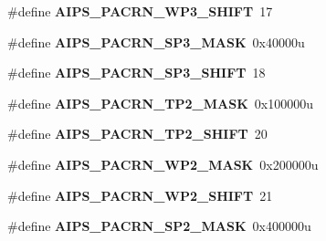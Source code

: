 \begin{DoxyCompactItemize}
\item 
\#define {\bfseries A\+I\+P\+S\+\_\+\+P\+A\+C\+R\+N\+\_\+\+W\+P3\+\_\+\+S\+H\+I\+FT}~17\hypertarget{group__AIPS__Register__Masks_gad54c0f7e77c172141f608dab604bed96}{}\label{group__AIPS__Register__Masks_gad54c0f7e77c172141f608dab604bed96}

\item 
\#define {\bfseries A\+I\+P\+S\+\_\+\+P\+A\+C\+R\+N\+\_\+\+S\+P3\+\_\+\+M\+A\+SK}~0x40000u\hypertarget{group__AIPS__Register__Masks_ga3a05b95b3d764b856f9731c5c1fb5b4c}{}\label{group__AIPS__Register__Masks_ga3a05b95b3d764b856f9731c5c1fb5b4c}

\item 
\#define {\bfseries A\+I\+P\+S\+\_\+\+P\+A\+C\+R\+N\+\_\+\+S\+P3\+\_\+\+S\+H\+I\+FT}~18\hypertarget{group__AIPS__Register__Masks_ga3aa6dd43b0bf34f36ad895cf07ebd3b2}{}\label{group__AIPS__Register__Masks_ga3aa6dd43b0bf34f36ad895cf07ebd3b2}

\item 
\#define {\bfseries A\+I\+P\+S\+\_\+\+P\+A\+C\+R\+N\+\_\+\+T\+P2\+\_\+\+M\+A\+SK}~0x100000u\hypertarget{group__AIPS__Register__Masks_ga42c229b1d1a656e908140ce42f69dea0}{}\label{group__AIPS__Register__Masks_ga42c229b1d1a656e908140ce42f69dea0}

\item 
\#define {\bfseries A\+I\+P\+S\+\_\+\+P\+A\+C\+R\+N\+\_\+\+T\+P2\+\_\+\+S\+H\+I\+FT}~20\hypertarget{group__AIPS__Register__Masks_ga55264ac15000e7a65c1b3ece9ce50c2a}{}\label{group__AIPS__Register__Masks_ga55264ac15000e7a65c1b3ece9ce50c2a}

\item 
\#define {\bfseries A\+I\+P\+S\+\_\+\+P\+A\+C\+R\+N\+\_\+\+W\+P2\+\_\+\+M\+A\+SK}~0x200000u\hypertarget{group__AIPS__Register__Masks_ga808a3a41e8c2169a806b5b8376dcfe72}{}\label{group__AIPS__Register__Masks_ga808a3a41e8c2169a806b5b8376dcfe72}

\item 
\#define {\bfseries A\+I\+P\+S\+\_\+\+P\+A\+C\+R\+N\+\_\+\+W\+P2\+\_\+\+S\+H\+I\+FT}~21\hypertarget{group__AIPS__Register__Masks_ga8a5a52975a1ef41510845556222bc10d}{}\label{group__AIPS__Register__Masks_ga8a5a52975a1ef41510845556222bc10d}

\item 
\#define {\bfseries A\+I\+P\+S\+\_\+\+P\+A\+C\+R\+N\+\_\+\+S\+P2\+\_\+\+M\+A\+SK}~0x400000u\hypertarget{group__AIPS__Register__Masks_ga3d358a7ce59552bbd61d80ea13e0af33}{}\label{group__AIPS__Register__Masks_ga3d358a7ce59552bbd61d80ea13e0af33}


\end{DoxyCompactItemize}
